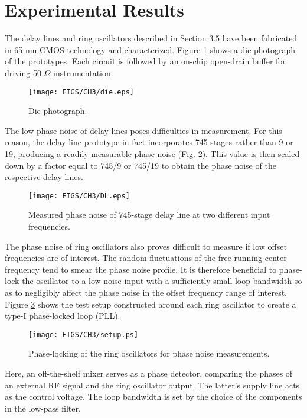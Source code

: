 \section{Experimental Results}

The delay lines and ring oscillators described in Section 3.5 have been fabricated in 65-nm CMOS technology and characterized. Figure \ref{fig:die} shows a die photograph
of the prototypes. Each circuit is followed by an on-chip open-drain buffer for driving 50-$\Omega$ instrumentation.
\begin{figure}[htb!]
\centering
\texttt{[image: FIGS/CH3/die.eps]}
\caption{Die photograph.}
\label{fig:die}
\end{figure}

The low phase noise of delay lines poses difficulties in measurement. For this reason, the delay line prototype in fact incorporates 745 stages rather than 9 or 19,
producing a readily measurable phase noise (Fig. \ref{fig:dl}). This value is then scaled down by a factor equal to 745/9 or 745/19 to obtain the phase noise of the
respective delay lines.
\begin{figure}[htb!]
\centering
\texttt{[image: FIGS/CH3/DL.eps]}
\caption{Measured phase noise of 745-stage delay line at two different input frequencies.}
\label{fig:dl}
\end{figure}


The phase noise of ring oscillators also proves difficult to measure if low offset frequencies are of interest. The random fluctuations of the free-running center frequency
tend to smear the phase noise profile. It is therefore beneficial to phase-lock the oscillator to a low-noise input with a sufficiently small loop bandwidth so as
to negligibly affect the phase noise in the offset frequency range of interest. Figure \ref{fig:setup} shows the test setup constructed around each ring oscillator to create
a type-I phase-locked loop (PLL).
\begin{figure}[htb!]
\centering
\texttt{[image: FIGS/CH3/setup.ps]}
\caption{Phase-locking of the ring oscillators for phase noise measurements.}
\label{fig:setup}
\end{figure}
Here, an off-the-shelf mixer serves as a phase detector, comparing the phases of an external RF signal and the ring oscillator output. The latter's supply line acts
as the control voltage. 
The loop bandwidth is set by the choice of the components in the low-pass filter.

